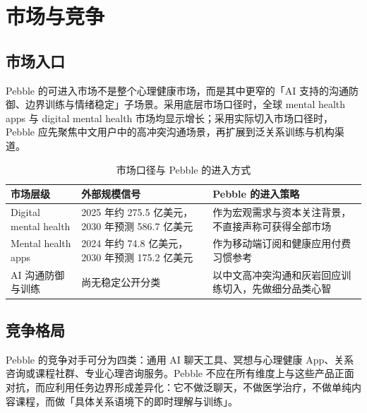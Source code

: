 \documentclass[UTF8,11pt,a4paper]{ctexart}
\newcommand{\thbg}[1]{\textcolor{PebbleInk}{\textbf{#1}}}
\begin{document}
\section{市场与竞争}

\subsection{市场入口}

Pebble 的可进入市场不是整个心理健康市场，而是其中更窄的「AI 支持的沟通防御、边界训练与情绪稳定」子场景。采用底层市场口径时，全球 mental health apps 与 digital mental health 市场均显示增长；采用实际切入市场口径时，Pebble 应先聚焦中文用户中的高冲突沟通场景，再扩展到泛关系训练与机构渠道。

\begin{table}[htbp]
\small
\caption{市场口径与 Pebble 的进入方式}
\centering
\begin{tabularx}{\textwidth}{p{4cm}YY}
\toprule
{}\thbg{市场层级} & \thbg{外部规模信号} & \thbg{Pebble 的进入策略} \\
\midrule
Digital mental health & 2025 年约 275.5 亿美元，2030 年预测 586.7 亿美元 & 作为宏观需求与资本关注背景，不直接声称可获得全部市场 \\
Mental health apps & 2024 年约 74.8 亿美元，2030 年预测 175.2 亿美元 & 作为移动端订阅和健康应用付费习惯参考 \\
AI 沟通防御与训练 & 尚无稳定公开分类 & 以中文高冲突沟通和灰岩回应训练切入，先做细分品类心智 \\
\bottomrule
\end{tabularx}
\end{table}

\subsection{竞争格局}

Pebble 的竞争对手可分为四类：通用 AI 聊天工具、冥想与心理健康 App、关系咨询或课程社群、专业心理咨询服务。Pebble 不应在所有维度上与这些产品正面对抗，而应利用任务边界形成差异化：它不做泛聊天，不做医学治疗，不做单纯内容课程，而做「具体关系语境下的即时理解与训练」。
\end{document}
